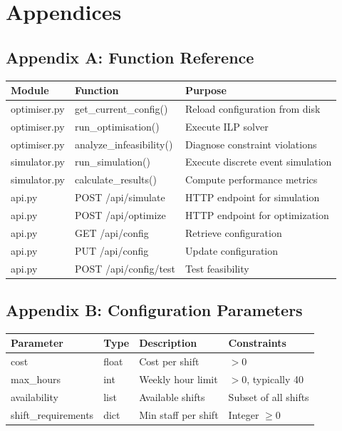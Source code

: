 \documentclass[12pt,a4paper]{article}
\begin{document}
\newpage

\section{Appendices}
\label{sec:appendices}

\subsection{Appendix A: Function Reference}
\label{appendix:functions}

\begin{center}
\small
\begin{tabular}{p{3cm}p{4cm}p{6cm}}
\toprule
\textbf{Module} & \textbf{Function} & \textbf{Purpose} \\
\midrule
optimiser.py & get\_current\_config() & Reload configuration from disk \\
optimiser.py & run\_optimisation() & Execute ILP solver \\
optimiser.py & analyze\_infeasibility() & Diagnose constraint violations \\
simulator.py & run\_simulation() & Execute discrete event simulation \\
simulator.py & calculate\_results() & Compute performance metrics \\
api.py & POST /api/simulate & HTTP endpoint for simulation \\
api.py & POST /api/optimize & HTTP endpoint for optimization \\
api.py & GET /api/config & Retrieve configuration \\
api.py & PUT /api/config & Update configuration \\
api.py & POST /api/config/test & Test feasibility \\
\bottomrule
\end{tabular}
\end{center}

\subsection{Appendix B: Configuration Parameters}
\label{appendix:config}

\begin{center}
\begin{tabular}{llp{5cm}l}
\toprule
\textbf{Parameter} & \textbf{Type} & \textbf{Description} & \textbf{Constraints} \\
\midrule
cost & float & Cost per shift & $> 0$ \\
max\_hours & int & Weekly hour limit & $> 0$, typically 40 \\
availability & list & Available shifts & Subset of all shifts \\
shift\_requirements & dict & Min staff per shift & Integer $\geq 0$ \\
\bottomrule
\end{tabular}
\end{center}
\end{document}

